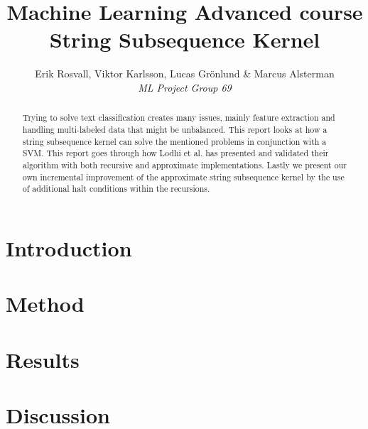 \documentclass[10pt,a4paper]{article}
\author{Erik Rosvall, Viktor Karlsson, Lucas Grönlund \& Marcus Alsterman \\ \textit{ML Project Group 69}}
\title{Machine Learning Advanced course \\ String Subsequence Kernel}
\begin{document}
	\begin{titlingpage}
		\maketitle
		\begin{abstract}
			\noindent
			\begin{addmargin}[4em]{4em}
			Trying to solve text classification creates many issues, mainly feature extraction and handling multi-labeled data that might be unbalanced. This report looks at how a string subsequence kernel can solve the mentioned problems in conjunction with a SVM. This report goes through how Lodhi et al. has presented and validated their algorithm with both recursive and approximate implementations. Lastly we present our own incremental improvement of the approximate string subsequence kernel by the use of additional halt conditions within the recursions. 			
	\end{addmargin}
		\end{abstract}
	\end{titlingpage}
	
	\section{Introduction}
	
	
	\section{Method}
	

	\section{Results}
	
	
	\section{Discussion}
	
	
	
	
	
\end{document}
